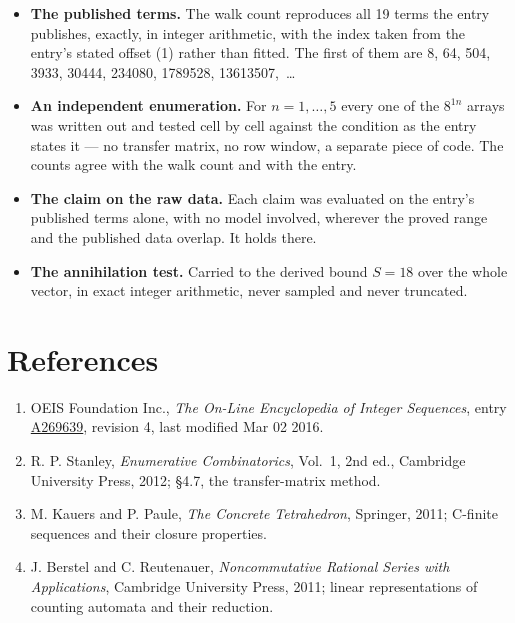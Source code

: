\documentclass[11pt]{article}
\theoremstyle{definition}
\begin{document}
\begin{itemize}

\item {\bfseries The published terms.} The walk count reproduces all 19 terms the entry publishes, exactly, in integer arithmetic, with the index taken from the entry's stated offset (1) rather than fitted. The first of them are 8, 64, 504, 3933, 30444, 234080, 1789528, 13613507,~\dots

\item {\bfseries An independent enumeration.} For $n = 1,\dots,5$ every one of the $8^{1n}$ arrays was written out and tested cell by cell against the condition as the entry states it --- no transfer matrix, no row window, a separate piece of code. The counts agree with the walk count and with the entry.

\item {\bfseries The claim on the raw data.} Each claim was evaluated on the entry's published terms alone, with no model involved, wherever the proved range and the published data overlap. It holds there.

\item {\bfseries The annihilation test.} Carried to the derived bound $S = 18$ over the whole vector, in exact integer arithmetic, never sampled and never truncated.

\end{itemize}

\section{References}

\begin{enumerate}

\item OEIS Foundation Inc., \emph{The On-Line Encyclopedia of Integer Sequences}, entry \href{https://oeis.org/A269639}{A269639}, revision 4, last modified Mar 02 2016.

\item R. P. Stanley, \emph{Enumerative Combinatorics}, Vol.~1, 2nd ed., Cambridge University Press, 2012; \S4.7, the transfer-matrix method.

\item M. Kauers and P. Paule, \emph{The Concrete Tetrahedron}, Springer, 2011; C-finite sequences and their closure properties.

\item J. Berstel and C. Reutenauer, \emph{Noncommutative Rational Series with Applications}, Cambridge University Press, 2011; linear representations of counting automata and their reduction.

\end{enumerate}
\end{document}
